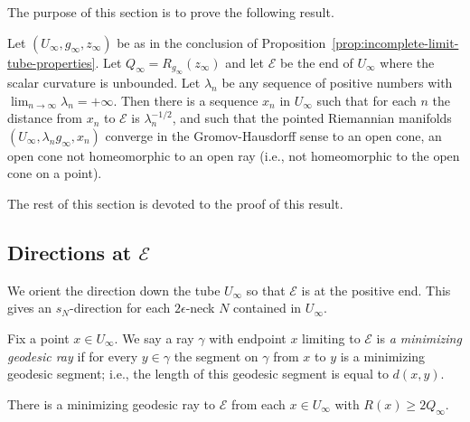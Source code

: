 The purpose of this section is to prove the following result.

\begin{proposition}
\label{prop:cone-limit-gromov-hausdorff}
\label{statement}
Let $(U_\infty,g_\infty,z_\infty)$  be as in the conclusion of
Proposition~\ref{prop:incomplete-limit-tube-properties}. Let $Q_\infty=R_{g_\infty}(z_\infty)$ and
let ${\mathcal E}$ be the end of $U_\infty$ where the scalar
curvature is unbounded. Let $\lambda_n$ be any sequence of positive
numbers with $\lim_{n\rightarrow\infty}\lambda_n=+\infty$. Then
there is a sequence $x_n$ in $U_\infty$ such that for each $n$ the
distance from $x_n$ to ${\mathcal E}$ is $\lambda_n^{-1/2}$, and
such that the pointed Riemannian manifolds
$(U_\infty,\lambda_ng_\infty,x_n)$ converge in the Gromov-Hausdorff
sense to an open cone, an open cone not homeomorphic to
an open ray (i.e., not homeomorphic to the open cone on a point).
\end{proposition}

The rest of this section is devoted to the proof of this result.

\subsection{Directions at ${\mathcal E}$}

 We orient the direction down the tube $U_\infty$ so that
${\mathcal E}$ is at the positive end. This gives an $s_N$-direction
for each $2\epsilon$-neck $N$ contained in $U_\infty$.




Fix a point $x\in U_\infty$. We say a ray $\gamma$ with endpoint $x$
limiting to ${\mathcal E}$ is {\sl a minimizing geodesic ray} if for
every $y\in \gamma$ the segment on $\gamma$ from $x$ to $y$ is a
minimizing geodesic segment; i.e., the length of this geodesic
segment is equal to $d(x,y)$.

\begin{claim}
\label{claim:minimizing-ray-to-end-exists}
There is a minimizing geodesic ray to ${\mathcal E}$ from each $x\in
U_\infty$ with $R(x)\ge 2Q_\infty$.
\end{claim}

